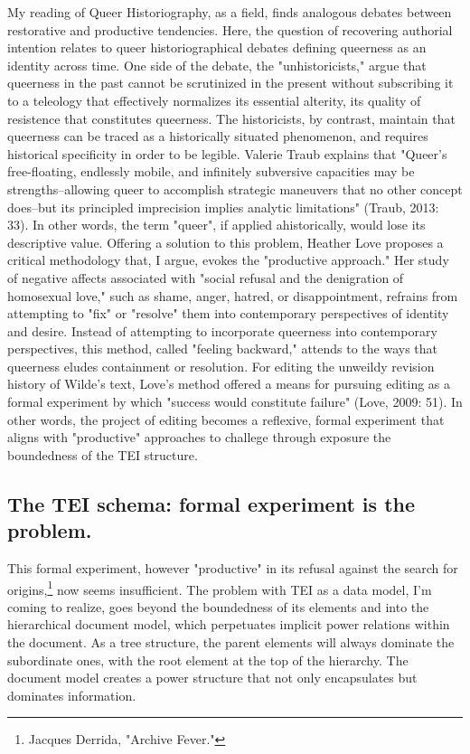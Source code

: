 \documentclass[11pt]{article}
\begin{document}
My reading of Queer Historiography, as a field, finds analogous
debates between restorative and productive tendencies. Here, the
question of recovering authorial intention relates to queer
historiographical debates defining queerness as an identity across
time. One side of the debate, the "unhistoricists," argue that
queerness in the past cannot be scrutinized in the present without
subscribing it to a teleology that effectively normalizes its
essential alterity, its quality of resistence that constitutes
queerness. The historicists, by contrast, maintain that queerness can
be traced as a historically situated phenomenon, and requires
historical specificity in order to be legible. Valerie Traub explains
that "Queer's free-floating, endlessly mobile, and infinitely
subversive capacities may be strengths--allowing queer to accomplish
strategic maneuvers that no other concept does--but its principled
imprecision implies analytic limitations" (Traub, 2013: 33). In other
words, the term "queer", if applied ahistorically, would lose its
descriptive value. Offering a solution to this problem, Heather Love
proposes a critical methodology that, I argue, evokes the "productive
approach." Her study of negative affects associated with "social
refusal and the denigration of homosexual love," such as shame, anger,
hatred, or disappointment, refrains from attempting to "fix" or
"resolve" them into contemporary perspectives of identity and
desire. Instead of attempting to incorporate queerness into
contemporary perspectives, this method, called "feeling backward,"
attends to the ways that queerness eludes containment or
resolution. For editing the unweildy revision history of Wilde's text,
Love's method offered a means for pursuing editing as a formal
experiment by which "success would constitute failure" (Love, 2009:
51). In other words, the project of editing becomes a reflexive,
formal experiment that aligns with "productive" approaches to challege
through exposure the boundedness of the TEI structure.

\subsection{The TEI schema: formal experiment is the problem.}
\label{sec:orgf3e2e56}
This formal experiment, however "productive" in its refusal against
the search for origins,\footnote{Jacques Derrida, "Archive Fever."} now seems insufficient. The problem with
TEI as a data model, I'm coming to realize, goes beyond the
boundedness of its elements and into the hierarchical document model,
which perpetuates implicit power relations within the document. As a
tree structure, the parent elements will always dominate the
subordinate ones, with the root element at the top of the
hierarchy. The document model creates a power structure that not only
encapsulates but dominates information.
\end{document}
